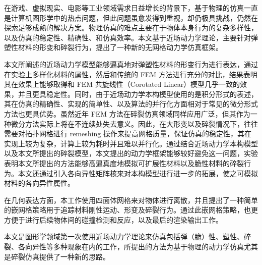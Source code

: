 \begin{cabstract}
在游戏、虚拟现实、电影等工业领域需求日益增长的背景下，基于物理的仿真一直是计算机图形学中的热点问题，但此问题虽愈发得到重视，却仍极具挑战，仍然在探索足够成熟的解决方案。物理仿真的难点主要在于物体本身行为的复杂多样性，以及仿真的稳定性、精确性、和仿真效率。本文基于近场动力学理论，主要针对弹塑性材料的形变和碎裂行为，提出了一种新的无网格动力学仿真框架。

本文所阐述的近场动力学模型能够逼真地对弹塑性材料的形变行为进行表达，通过在实验上多样化材料的属性，然后和传统的 FEM 方法进行充分的对比，结果表明其在效果上能够取得和 FEM 共旋线性（Corotated Linear）模型几乎一致的效果，并且更具稳定性。同时，由于近场动力学本构模型使用的是积分形式的表述，其在仿真的精确性、实现的简单性、以及算法的并行化方面相对于常见的微分形式方法也更具优势。虽然近年 FEM 方法在碎裂仿真领域同样应用广泛，但其作为一种微分方法实际上将在不连续处失去意义。因此，在大形变以及碎裂情况下，往往需要对拓扑网格进行 remeshing 操作来提高网格质量，保证仿真的稳定性，其在实现上较为复杂，计算上较为耗时并且难以并行化。通过结合近场动力学本构模型以及本文所提出的碎裂模型，本文提出的动力学框架能够较好避免这一问题，实验表明本文所提出的方法能够高逼真度地模拟可扩展性材料以及脆性材料的碎裂行为。本文还通过引入各向异性矩阵核来对本构模型进行进一步的拓展，使之可模拟材料的各向异性属性。

在几何表达方面，本工作使用四面体网格来对物体进行离散，并且提出了一种简单的嵌网格策略用于追踪材料刚性运动、形变及碎裂行为。通过此嵌网格策略，也更方便于进行后续物体间的碰撞检测和反应，以及最后的渲染输出工作。

本文是图形学领域第一次使用近场动力学理论来仿真包括弹（脆）性、塑性、碎裂、各向异性等多种现象在内的工作，所提出的方法为基于物理的动力学仿真尤其是碎裂仿真提供了一种新的思路。

\end{cabstract}

